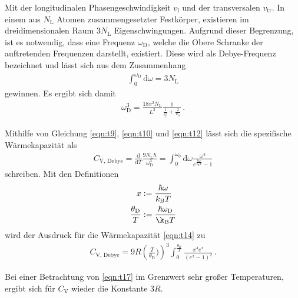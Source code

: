 Mit der longitudinalen Phasengeschwindigkeit $v_{\text{l}}$
und der transversalen $v_{\text{tr}}$.
In einem aus $N_{\text{L}}$ Atomen zusammengesetzter Festkörper,
existieren im dreidimensionalen Raum $3N_{\text{L}}$ Eigenschwingungen.
Aufgrund dieser Begrenzung, ist es notwendig, dass eine
Frequenz $\omega_{\text{D}}$, welche die Obere Schranke der auftretenden
Frequenzen darstellt, existiert.
Diese wird als Debye-Frequenz bezeichnet und lässt sich
aus dem Zusammenhang
\begin{align}
	\int_{0}^{\omega_{\text{D}}} \mathrm{d}\omega = 3 N_{\text{L}} \label{eqn:t11}
\end{align}
gewinnen.
Es ergibt sich damit
\begin{align}
	\omega_{\text{D}}^{3} = \frac{18 \pi^{2} N_{\text{L}}}{L^{3}}
	\frac{1}{\frac{1}{v_{\text{l}}^{3}} + \frac{2}{v_{\text{tr}}}} \, .\label{eqn:t12}
\end{align}

Mithilfe von Gleichung \ref{eqn:t9}, \ref{eqn:t10} und \ref{eqn:t12}
lässt sich die spezifische Wärmekapazität als
\begin{align}
	C_{\text{V, Debye}} = \frac{\mathrm{d}}{\mathrm{d}T} \frac{9 N_{\text{L}} \hbar}{\omega_{\text{D}}^{3}}
	= \int_{0}^{\omega_{0}} \mathrm{d}\omega \frac{\omega^{3}}{e^{\frac{\hbar \omega}{k_{\text{B}} T}} - 1} \label{eqn:t14}
\end{align}
schreiben.
Mit den Definitionen
\begin{align*}
	x &:= \frac{\hbar \omega}{k_{\text{B}} T}\\
	\frac{\theta_{\text{D}}}{T} &:= \frac{\hbar \omega_{\text{D}}}{\k_{\text{B}} T}
\end{align*}
wird der Ausdruck für die Wärmekapazität \ref{eqn:t14} zu
\begin{align}
	C_{\text{V, Debye}} = 9 R \left(\frac{T}{\theta_{\text{D}}})\right)^{3}
	\int_{0}^{\frac{\theta_{\text{D}}}{T}} \frac{x^{4} e^{x}}{\left( e^{x} - 1 \right)^{2}} \, . \label{eqn:t17}
\end{align}

Bei einer Betrachtung von \ref{eqn:t17} im Grenzwert sehr großer Temperaturen,
ergibt sich für $C_{\text{V}}$ wieder die Konstante $3R$.
\cite{sample}
